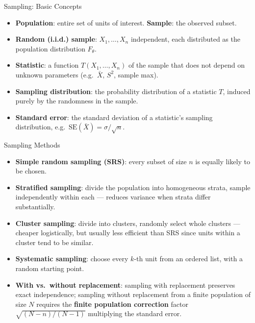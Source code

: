 \documentclass[11pt,aspectratio=169]{beamer}
\newcommand{\Xbar}{\bar{X}}
\begin{document}
\begin{frame}{Sampling: Basic Concepts}
\begin{itemize}
    \item \textbf{Population}: entire set of units of interest.
          \textbf{Sample}: the observed subset.
    \item \textbf{Random (i.i.d.) sample}: $X_1,\dots,X_n$ independent,
          each distributed as the population distribution $F_\theta$.
    \item \textbf{Statistic}: a function $T(X_1,\dots,X_n)$ of the sample
          that does not depend on unknown parameters (e.g.\ $\Xbar$, $S^2$,
          sample max).
    \item \textbf{Sampling distribution}: the probability distribution of a
          statistic $T$, induced purely by the randomness in the sample.
    \item \textbf{Standard error}: the standard deviation of a statistic's
          sampling distribution, e.g.\ $\text{SE}(\Xbar)=\sigma/\sqrt n$.
\end{itemize}
\end{frame}

\begin{frame}{Sampling Methods}
\begin{itemize}
    \item \textbf{Simple random sampling (SRS)}: every subset of size $n$
          is equally likely to be chosen.
    \item \textbf{Stratified sampling}: divide the population into
          homogeneous strata, sample independently within each — reduces
          variance when strata differ substantially.
    \item \textbf{Cluster sampling}: divide into clusters, randomly select
          whole clusters — cheaper logistically, but usually less efficient
          than SRS since units within a cluster tend to be similar.
    \item \textbf{Systematic sampling}: choose every $k$-th unit from an
          ordered list, with a random starting point.
    \item \textbf{With vs.\ without replacement}: sampling with replacement
          preserves exact independence; sampling without replacement from a
          finite population of size $N$ requires the \textbf{finite
          population correction} factor $\sqrt{(N-n)/(N-1)}$ multiplying the
          standard error.
\end{itemize}
\end{frame}
\end{document}
